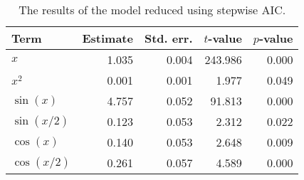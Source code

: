 \begin{table}[t]

\caption{\label{tab:stepwise-regression}The results of the model reduced using stepwise \ac{AIC}.}
\centering
\begin{tabular}{lrrrr}
\toprule
Term & Estimate & Std. err. & \(t\)-value & \(p\)-value\\
\midrule
\(x\) & 1.035 & 0.004 & 243.986 & 0.000\\
\(x^2\) & 0.001 & 0.001 & 1.977 & 0.049\\
\(\sin(x)\) & 4.757 & 0.052 & 91.813 & 0.000\\
\(\sin(x/2)\) & 0.123 & 0.053 & 2.312 & 0.022\\
\(\cos(x)\) & 0.140 & 0.053 & 2.648 & 0.009\\
\(\cos(x/2)\) & 0.261 & 0.057 & 4.589 & 0.000\\
\bottomrule
\end{tabular}
\end{table}
